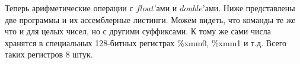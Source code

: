 \documentclass[a4paper,12pt]{article}
\begin{document}
Теперь арифметические операции с $float$'ами и $double$'ами. Ниже представлены две программы и их ассемблерные листинги. Можем видеть, что команды те же что и для целых чисел, но с другими суффиксами. К тому же сами числа хранятся в специальных 128-битных регистрах \%xmm0, \%xmm1 и т.д. Всего таких регистров 8 штук.
\begin{figure}[H]\label{fig: Code operations float and double}
\end{figure}
\end{document}
